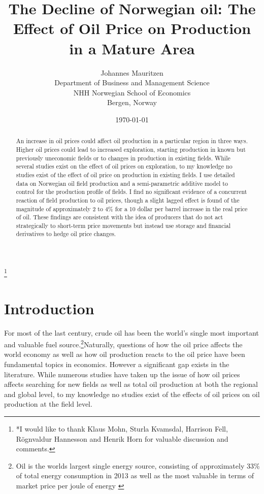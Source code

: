 \documentclass[12pt]{article}
\title{The Decline of Norwegian oil: The Effect of Oil Price on Production in a Mature Area}
\author{Johannes Mauritzen \\
		Department of Business and Management Science\\
        NHH Norwegian School of Economics\\
        Bergen, Norway \\	           
		}
\date{\today}
\begin{document}
\begin{spacing}{1} %
	\maketitle


\begin{abstract}
An increase in oil prices could affect oil production in a particular region in three ways.  Higher oil prices could lead to increased exploration, starting production in known but previously uneconomic fields or to changes in production in existing fields.  While several studies exist on the effect of oil prices on exploration, to my knowledge no studies exist of the effect of oil price on production in existing fields.  I use detailed data on Norwegian oil field production and a semi-parametric additive model to control for the production profile of fields.  I find no significant evidence of a concurrent reaction of field production to oil prices, though a slight lagged effect is found of the magnitude of approximately 2 to 4\% for a 10 dollar per barrel increase in the real price of oil.  These findings are consistent with the idea of producers that do not act strategically to short-term price movements but instead use storage and financial derivatives to hedge oil price changes.  
\end{abstract}

\thanks{*I would like to thank Klaus Mohn, Sturla Kvamsdal, Harrison Fell, Rögnvaldur Hannesson and Henrik Horn for valuable discussion and comments.}

\end{spacing}
\section{Introduction}

For most of the last century, crude oil has been the world’s single most important and valuable fuel source.\footnote{Oil is the worlds largest single energy source, consisting of approximately 33\% of total energy consumption in 2013 as well as the most valuable in terms of market price per joule of energy \citet{bp_2013}}Naturally, questions of how the oil price affects the world economy as well as how oil production reacts to the oil price have been fundamental topics in economics. However a significant gap exists in the literature.  While numerous studies have taken up the issue of how oil prices affects searching for new fields as well as total oil production at both the regional and global level, to my knowledge no studies exist of the effects of oil prices on oil production at the field level.   
\end{document}
